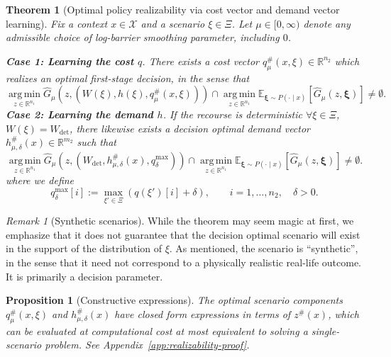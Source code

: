 \documentclass{article}
\newcommand{\R}{\mathbb{R}}
\newcommand{\E}{\mathbb{E}}
\newcommand{\1}{\mathbf{1}}
\newcommand{\argmin}{\operatorname*{arg\,min}}
\theoremstyle{plain}
\newtheorem{theorem}{Theorem}
\newtheorem{proposition}{Proposition}
\theoremstyle{definition}
\theoremstyle{remark}
\newtheorem{remark}{Remark}
\begin{document}
\begin{theorem}[Optimal policy realizability via cost vector and demand vector learning]
\label{thm:realizability}
Fix a context $x\in\mathcal X$ and a scenario $\xi\in\Xi$. Let $\mu \in [0,\infty)$ denote any admissible choice of log-barrier smoothing parameter, including $0$.

\textbf{Case 1: Learning the cost $q$}.
There exists a cost vector
$q_\mu^\#(x,\xi)\in\R^{n_2}$ which realizes an optimal first-stage decision, in the sense that
\begin{equation}
\label{eq:q-decision-optimal}
\argmin_{z\in\R^{n_1}}
\hat G_\mu\!\left(
z,
\left(W(\xi),h(\xi),q_\mu^\#(x,\xi)\right)
\right)
\cap
\argmin_{z\in\R^{n_1}}
\E_{\boldsymbol{\xi}\sim P(\cdot\mid x)}
\!\left[\hat G_\mu(z,\boldsymbol{\xi})\right]
\neq\emptyset.
\end{equation}
\textbf{Case 2: Learning the demand $h$}.
If the recourse is deterministic $\forall \xi\in\Xi$, $W(\xi)=W_{\det}$, there likewise exists a decision optimal demand vector
$h_{\mu,\delta}^\#(x)\in\R^{m_2}$ such that
\begin{equation}
\label{eq:h-decision-optimal}
\argmin_{z\in\R^{n_1}}
\hat G_\mu\!\left(
z,
\left(W_{\det},h_{\mu,\delta}^\#(x),q_\delta^{\max}\right)
\right)
\cap
\argmin_{z\in\R^{n_1}}
\E_{\boldsymbol{\xi}\sim P(\cdot\mid x)}
\!\left[\hat G_\mu(z,\boldsymbol{\xi})\right]
\neq\emptyset.
\end{equation}
where we define
\begin{equation}
\label{eq:qmaxdelta}
q_\delta^{\max}[i]:=\max_{\xi'\in\Xi}\left(q(\xi')[i]+\delta\right),
\qquad i=1,\ldots,n_2,\quad \delta>0.
\end{equation}
\end{theorem}

\begin{remark}[Synthetic scenarios]
\label{rem:synthetic-scenarios}
While the theorem may seem magic at first, we emphasize that it does not guarantee that the decision optimal scenario will exist in the support of the distribution of $\xi$. As mentioned, the scenario is ``synthetic'', in the sense that it need not correspond to a physically realistic real-life outcome. It is primarily a decision parameter.
\end{remark}

\begin{proposition}[Constructive expressions]
\label{prop:constructive}
The optimal scenario components $q_\mu^\#(x,\xi)$ and $h_{\mu,\delta}^\#(x)$ have closed form expressions in terms of $z^\#(x)$, which can be evaluated at computational cost at most equivalent to solving a single-scenario problem. See Appendix~\ref{app:realizability-proof}.
\end{proposition}
\end{document}
